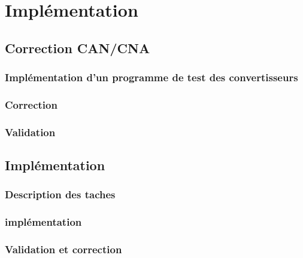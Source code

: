 \chapter{Implémentation}
\section{Correction CAN/CNA}
	\subsection{Implémentation d'un programme de test des convertisseurs}
	\subsection{Correction}
	\subsection{Validation}
\section{Implémentation}
		\subsection{Description des taches}
		\subsection{implémentation}
		\subsection{Validation et correction}
